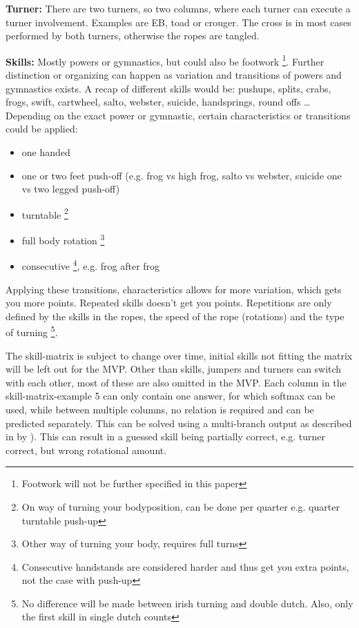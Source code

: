 \textbf{Turner:} There are two turners, so two columns, where each turner can execute a turner involvement. Examples are EB, toad or crouger. The cross is in most cases performed by both turners, otherwise the ropes are tangled.

\textbf{Skills:} Mostly powers or gymnastics, but could also be footwork \footnote{Footwork will not be further specified in this paper}. Further distinction or organizing can happen as variation and transitions of powers and gymnastics exists. A recap of different skills would be: pushups, splits, crabs, frogs, swift, cartwheel, salto, webster, suicide, handsprings, round offs \dots %
Depending on the exact power or gymnastic, certain characteristics or transitions could be applied:

\begin{itemize}
    \item one handed
    \item one or two feet push-off (e.g. frog vs high frog, salto vs webster, suicide one vs two legged push-off)
    \item turntable \footnote{On way of turning your bodyposition, can be done per quarter e.g. quarter turntable push-up}
    \item full body rotation \footnote{Other way of turning your body, requires full turns}
    \item consecutive \footnote{Consecutive handstands are considered harder and thus get you extra points, not the case with push-up}, e.g. frog after frog
\end{itemize}

Applying these transitions, characteristics allows for more variation, which gets you more points. Repeated skills doesn't get you points. Repetitions are only defined by the skills in the ropes, the speed of the rope (rotations) and the type of turning \footnote{No difference will be made between irish turning and double dutch. Also, only the first skill in single dutch counts}.

\medskip

The skill-matrix is subject to change over time, initial skills not fitting the matrix will be left out for the MVP. Other than skills, jumpers and turners can switch with each other, most of these are also omitted in the MVP.
Each column in the skill-matrix-example 5 can only contain one answer, for which softmax can be used, while between multiple columns, no relation is required and can be predicted separately. This can be solved using a multi-branch output as described in by \autocite{Coulibaly_2022}). This can result in a guessed skill being partially correct, e.g. turner correct, but wrong rotational amount.

